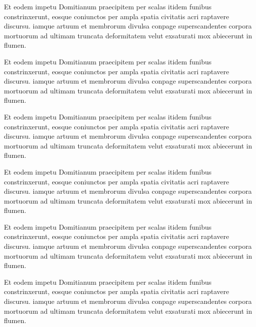Et eodem impetu \cite{ref1}Domitianum praecipitem per scalas itidem funibus constrinxerunt, eosque coniunctos per ampla spatia civitatis acri raptavere discursu. iamque artuum et membrorum divulsa conpage superscandentes corpora mortuorum ad ultimam truncata deformitatem velut \cite{ref2} exsaturati mox abiecerunt in flumen.

Et eodem impetu \cite{ref1}Domitianum praecipitem per scalas itidem funibus constrinxerunt, eosque coniunctos per ampla spatia civitatis acri raptavere discursu. iamque artuum et membrorum divulsa conpage superscandentes corpora mortuorum ad ultimam truncata deformitatem velut \cite{ref2} exsaturati mox abiecerunt in flumen.

Et eodem impetu \cite{ref1}Domitianum praecipitem per scalas itidem funibus constrinxerunt, eosque coniunctos per ampla spatia civitatis acri raptavere discursu. iamque artuum et membrorum divulsa conpage superscandentes corpora mortuorum ad ultimam truncata deformitatem velut \cite{ref2} exsaturati mox abiecerunt in flumen.

Et eodem impetu \cite{ref1}Domitianum praecipitem per scalas itidem funibus constrinxerunt, eosque coniunctos per ampla spatia civitatis acri raptavere discursu. iamque artuum et membrorum divulsa conpage superscandentes corpora mortuorum ad ultimam truncata deformitatem velut \cite{ref2} exsaturati mox abiecerunt in flumen.

Et eodem impetu \cite{ref1}Domitianum praecipitem per scalas itidem funibus constrinxerunt, eosque coniunctos per ampla spatia civitatis acri raptavere discursu. iamque artuum et membrorum divulsa conpage superscandentes corpora mortuorum ad ultimam truncata deformitatem velut \cite{ref2} exsaturati mox abiecerunt in flumen.

Et eodem impetu \cite{ref1}Domitianum praecipitem per scalas itidem funibus constrinxerunt, eosque coniunctos per ampla spatia civitatis acri raptavere discursu. iamque artuum et membrorum divulsa conpage superscandentes corpora mortuorum ad ultimam truncata deformitatem velut \cite{ref2} exsaturati mox abiecerunt in flumen.